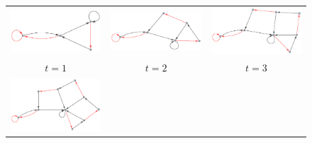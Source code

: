 \documentclass[12pt,a4paper]{article}
\begin{document}
\begin{figure}[htp]
\begin{tabular}{c c c}
\includegraphics[scale=0.5]{img/184/1.eps} &
\includegraphics[scale=0.5]{img/184/2.eps} &
\includegraphics[scale=0.5]{img/184/3.eps}  \\
$t = 1$ & $t = 2$ & $t = 3$ \\
\includegraphics[scale=0.5]{img/184/4.eps} &

\end{tabular}
\end{figure}
\end{document}
